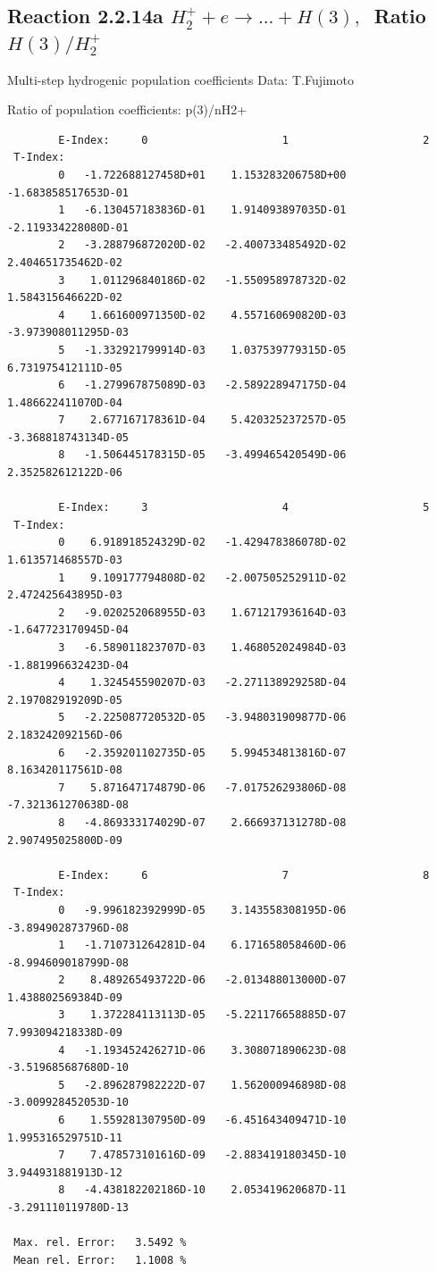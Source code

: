 \documentclass[12pt,dvips]{article}
\begin{document}
\newpage
\subsection{
Reaction 2.2.14a $ H_2^+ + e \rightarrow ...+ H(3) , \  $
Ratio $H(3)/H_2^+ $
}

 Multi-step hydrogenic population coefficients
 Data: T.Fujimoto

 Ratio of population coefficients: p(3)/nH2+


\begin{small}\begin{verbatim}
        E-Index:     0                     1                     2
 T-Index:
        0   -1.722688127458D+01    1.153283206758D+00   -1.683858517653D-01
        1   -6.130457183836D-01    1.914093897035D-01   -2.119334228080D-01
        2   -3.288796872020D-02   -2.400733485492D-02    2.404651735462D-02
        3    1.011296840186D-02   -1.550958978732D-02    1.584315646622D-02
        4    1.661600971350D-02    4.557160690820D-03   -3.973908011295D-03
        5   -1.332921799914D-03    1.037539779315D-05    6.731975412111D-05
        6   -1.279967875089D-03   -2.589228947175D-04    1.486622411070D-04
        7    2.677167178361D-04    5.420325237257D-05   -3.368818743134D-05
        8   -1.506445178315D-05   -3.499465420549D-06    2.352582612122D-06

        E-Index:     3                     4                     5
 T-Index:
        0    6.918918524329D-02   -1.429478386078D-02    1.613571468557D-03
        1    9.109177794808D-02   -2.007505252911D-02    2.472425643895D-03
        2   -9.020252068955D-03    1.671217936164D-03   -1.647723170945D-04
        3   -6.589011823707D-03    1.468052024984D-03   -1.881996632423D-04
        4    1.324545590207D-03   -2.271138929258D-04    2.197082919209D-05
        5   -2.225087720532D-05   -3.948031909877D-06    2.183242092156D-06
        6   -2.359201102735D-05    5.994534813816D-07    8.163420117561D-08
        7    5.871647174879D-06   -7.017526293806D-08   -7.321361270638D-08
        8   -4.869333174029D-07    2.666937131278D-08    2.907495025800D-09

        E-Index:     6                     7                     8
 T-Index:
        0   -9.996182392999D-05    3.143558308195D-06   -3.894902873796D-08
        1   -1.710731264281D-04    6.171658058460D-06   -8.994609018799D-08
        2    8.489265493722D-06   -2.013488013000D-07    1.438802569384D-09
        3    1.372284113113D-05   -5.221176658885D-07    7.993094218338D-09
        4   -1.193452426271D-06    3.308071890623D-08   -3.519685687680D-10
        5   -2.896287982222D-07    1.562000946898D-08   -3.009928452053D-10
        6    1.559281307950D-09   -6.451643409471D-10    1.995316529751D-11
        7    7.478573101616D-09   -2.883419180345D-10    3.944931881913D-12
        8   -4.438182202186D-10    2.053419620687D-11   -3.291110119780D-13

 Max. rel. Error:   3.5492 %
 Mean rel. Error:   1.1008 %


\end{verbatim}\end{small}
\end{document}
